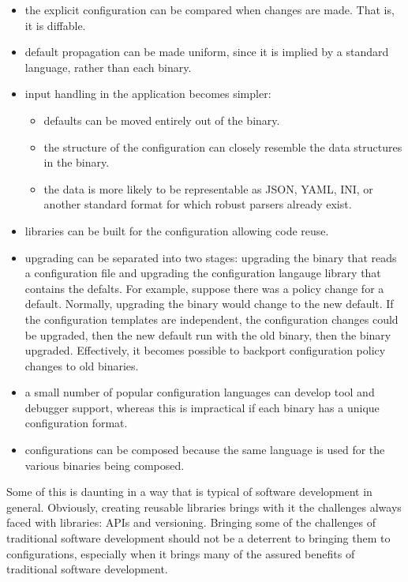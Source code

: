 \documentclass[letterpaper,twocolumn,10pt]{article}
\begin{document}
\begin{itemize}
\item the explicit configuration can be compared when changes are made. That is, it is diffable.
\item default propagation can be made uniform, since it is implied by a standard language, rather than each binary.
\item input handling in the application becomes simpler:
	\begin{itemize}
	\item defaults can be moved entirely out of the binary.
	\item the structure of the configuration can closely resemble the data structures in the binary.
	\item the data is more likely to be representable as JSON, YAML, INI, or another standard format for which robust parsers already exist.
  \end{itemize}
\item libraries can be built for the configuration allowing code reuse.
\item upgrading can be separated into two stages: upgrading the binary that reads a configuration file and upgrading the configuration langauge library that contains the defalts. For example, suppose there was a policy change for a default. Normally, upgrading the binary would change to the new default. If the configuration templates are independent, the configuration changes could be upgraded, then the new default run with the old binary, then the binary upgraded. Effectively, it becomes possible to backport configuration policy changes to old binaries.
\item a small number of popular configuration languages can develop tool and debugger support, whereas this is impractical if each binary has a unique configuration format.
\item configurations can be composed because the same language is used for the various binaries being composed.
\end{itemize}

Some of this is daunting in a way that is typical of software development in general. Obviously, creating reusable libraries brings with it the challenges always faced with libraries: APIs and versioning. Bringing some of the challenges of traditional software development should not be a deterrent to bringing them to configurations, especially when it brings many of the assured benefits of traditional software development.
\end{document}
